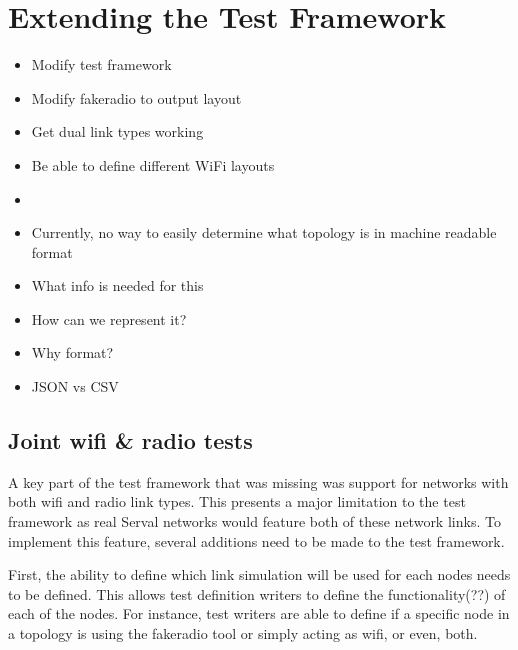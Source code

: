 
\chapter{Extending the Test Framework} %
\label{Chapter4}


\begin{itemize}
    \item Modify test framework
    \item Modify fakeradio to output layout
    \item Get dual link types working
    \item Be able to define different WiFi layouts
    \item 
\end{itemize}


\begin{itemize}
    \item Currently, no way to easily determine what topology is in machine readable format
    \item What info is needed for this 
    \item How can we represent it?
    \item Why format?
    \item JSON vs CSV
    
\end{itemize}


\section{Joint wifi \& radio tests}
A key part of the test framework that was missing was support for networks with both wifi and radio link types. 
This presents a major limitation  to the test framework as real Serval networks would feature both of these network links.
To implement this feature, several additions need to be made to the test framework.

First, the ability to define which link simulation will be used for each nodes needs to be defined.
This allows test definition writers to define the functionality(??) of each of the nodes. 
For instance, test writers are able to define if a specific node in a topology is using the fakeradio tool or simply acting as wifi, or even, both. 

